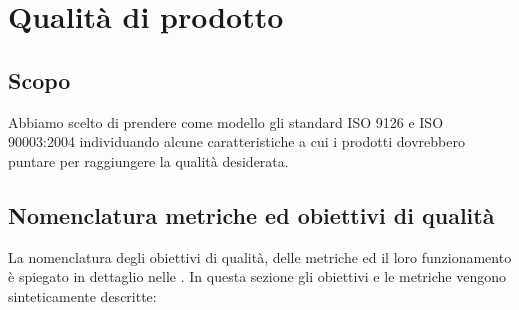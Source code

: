 
\section{Qualità di prodotto}\label{qualità di prodotto}

\subsection{Scopo}
Abbiamo scelto di prendere come modello gli standard ISO 9126 e ISO 90003:2004 individuando alcune caratteristiche a cui i prodotti dovrebbero puntare per raggiungere la qualità desiderata.

\subsection{Nomenclatura metriche ed obiettivi di qualità}	\label{nomenclaturaprodotti}
La nomenclatura degli obiettivi di qualità, delle metriche ed il loro funzionamento è spiegato in dettaglio nelle \NdP. In questa sezione gli obiettivi e le metriche vengono sinteticamente descritte:

